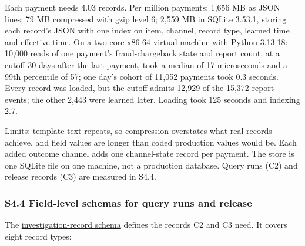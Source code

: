 \documentclass[
  11pt,
]{article}
\begin{document}
\endgroup

Each payment needs 4.03 records. Per million payments: 1,656 MB as JSON
lines; 79 MB compressed with gzip level 6; 2,559 MB in SQLite 3.53.1,
storing each record's JSON with one index on item, channel, record type,
learned time and effective time. On a two-core x86-64 virtual machine
with Python 3.13.18: 10,000 reads of one payment's fraud-chargeback
state and report count, at a cutoff 30 days after the last payment, took
a median of 17 microseconds and a 99th percentile of 57; one day's
cohort of 11,052 payments took 0.3 seconds. Every record was loaded, but
the cutoff admits 12,929 of the 15,372 report events; the other 2,443
were learned later. Loading took 125 seconds and indexing 2.7.

Limits: template text repeats, so compression overstates what real
records achieve, and field values are longer than coded production
values would be. Each added outcome channel adds one channel-state
record per payment. The store is one SQLite file on one machine, not a
production database. Query runs (C2) and release records (C3) are
measured in S4.4.

\hypertarget{s44-field-level-schemas-for-query-runs-and-release}{%
\subsubsection{S4.4 Field-level schemas for query runs and
release}\label{s44-field-level-schemas-for-query-runs-and-release}}

The
\href{SUPPLEMENT/S4_INVESTIGATION_RECORDS/investigation_records.schema.json}{investigation-record
schema} defines the records C2 and C3 need. It covers eight record
types:

\begingroup\small
\end{document}
